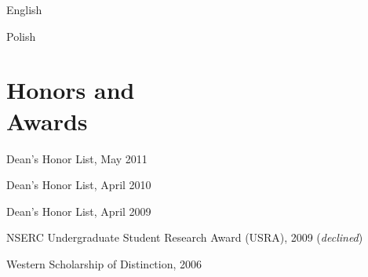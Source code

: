 \documentclass[margin,line]{resume}
\begin{document}
\begin{resume}
\begin{list2}
	\item English
	\item Polish
\end{list2}

\section{\mysidestyle Honors and\\Awards}

\begin{list2}
	\item Dean's Honor List, May 2011
	\item Dean's Honor List, April 2010
	\item Dean's Honor List, April 2009
	\item NSERC Undergraduate Student Research Award (USRA), 2009	\hfill(\textsl{declined})
	\item Western Scholarship of Distinction, 2006 
\end{list2}



\end{resume}
\end{document}
